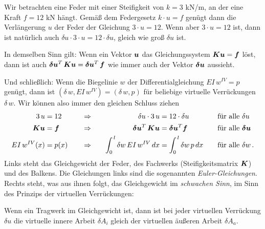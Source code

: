 Wir betrachten eine Feder mit einer Steifigkeit von $k = 3$ kN/m, an der eine Kraft $f = 12$ kN h\"{a}ngt. Gem\"{a}{\ss} dem Federgesetz $k \cdot u = f$ gen\"{u}gt dann die
Verl\"{a}ngerung $u$ der Feder der Gleichung $3 \cdot u = 12$. Wenn aber $3 \cdot u = 12$ ist, dann ist nat\"{u}rlich auch $\delta u \cdot 3\cdot u = 12 \cdot \delta u$, gleich wie gro{\ss} $\delta u$ ist.

In demselben Sinn gilt: Wenn ein Vektor $\mbox{\boldmath $u$}$ das Gleichungssystem $\mbox{\boldmath $K$} \mbox{\boldmath $u$} = \mbox{\boldmath $f$}$ l\"{o}st, dann ist
auch $\mbox{\boldmath $\delta$} \mbox{\boldmath $u$}^T\,\mbox{\boldmath $K$}\mbox{\boldmath $u$} = \mbox{\boldmath $\delta$} \mbox{\boldmath $u$}^T\,\mbox{\boldmath $f$}$ wie immer auch der
Vektor $\mbox{\boldmath $\delta$} \mbox{\boldmath $u$}$ aussieht.

Und schlie{\ss}lich: Wenn die Biegelinie $w$ der Differentialgleichung
$EI\,w^{IV} = p$ gen\"{u}gt, dann ist $(\delta\,w,EI\,w^{IV}) = (\delta \,w,p)$ f\"{u}r
beliebige virtuelle Verr\"{u}ckungen $\delta\,w$. Wir k\"{o}nnen also immer den gleichen Schluss ziehen
\begin{alignat}{4}
3\,u &= 12  &&\quad\Rightarrow \quad &\delta u \cdot 3\, u &= 12 \cdot \delta u & &\quad \mbox{f\"{u}r alle $\delta u$}\nonumber \\
\mbox{\boldmath $K$} \mbox{\boldmath $u$} &= \mbox{\boldmath $f$}  &&\quad\Rightarrow \quad &\mbox{\boldmath $\delta$} \mbox{\boldmath $u$}^T \,\mbox{\boldmath $K$} \mbox{\boldmath $u$} &= \mbox{\boldmath $\delta$} \mbox{\boldmath $u$}^T \mbox{\boldmath $f$} & &\quad \mbox{f\"{u}r alle $\mbox{\boldmath $\delta$} \mbox{\boldmath $u$}$}\nonumber \\
EI\,w^{IV}(x) &= p(x) &&\quad\Rightarrow \quad &\int_0^{\,l} \delta w\,EI\,w^{IV}\,dx &=
\int_0^{\,l} \delta w\,p\,dx & &\quad \mbox{f\"{u}r alle $\delta w$}\,. \nonumber \label{A12DEZ2}
\end{alignat}
Links steht das Gleichgewicht der Feder, des Fachwerks (Steifigkeitsmatrix $\mbox{\boldmath $K$}$) und des Balkens. Die Gleichungen links sind die sogenannten {\em Euler-Gleichungen\/}. Rechts steht, was aus ihnen folgt, das Gleichgewicht im {\em schwachen Sinn\/}, im Sinn des Prinzips der virtuellen Verr\"{u}ckungen:\\

\hspace*{-12pt}\colorbox{highlightBlue}{\parbox{0.98\textwidth}{ Wenn ein Tragwerk im Gleichgewicht ist, dann ist bei jeder virtuellen Verr\"{u}ckung
$\delta u$ die virtuelle innere Arbeit $\delta A_i$ gleich der virtuellen \"{a}u{\ss}eren Arbeit
$\delta A_a$.}}\\

